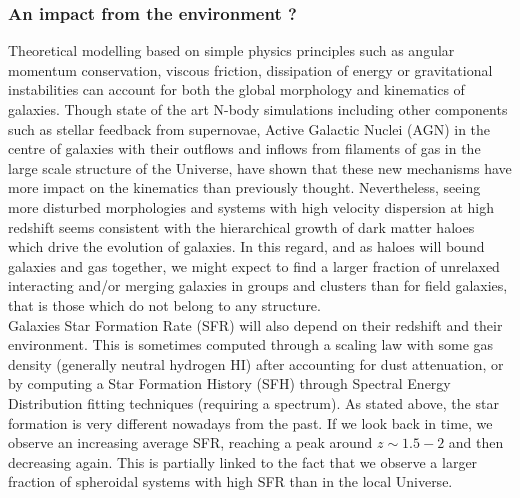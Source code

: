 \subsubsection{An impact from the environment ?}

Theoretical modelling based on simple physics principles such as angular momentum conservation, viscous friction, dissipation of energy or gravitational instabilities can account for both the global morphology and kinematics of galaxies. Though state of the art N-body simulations including other components such as stellar feedback from supernovae, Active Galactic Nuclei (AGN) in the centre of galaxies with their outflows and inflows from filaments of gas in the large scale structure of the Universe, have shown that these new mechanisms have more impact on the kinematics than previously thought. Nevertheless, seeing more disturbed morphologies and systems with high velocity dispersion at high redshift seems consistent with the hierarchical growth of dark matter haloes which drive the evolution of galaxies. In this regard, and as haloes will bound galaxies and gas together, we might expect to find a larger fraction of unrelaxed interacting and/or merging galaxies in groups and clusters than for field galaxies, that is those which do not belong to any structure. \\


Galaxies Star Formation Rate (SFR) will also depend on their redshift and their environment. This is sometimes computed through a scaling law with some gas density (generally neutral hydrogen HI) after accounting for dust attenuation, or by computing a Star Formation History (SFH) through Spectral Energy Distribution fitting techniques (requiring a spectrum). As stated above, the star formation is very different nowadays from the past. If we look back in time, we observe an increasing average SFR, reaching a peak around $z \sim 1.5 - 2$ and then decreasing again. This is partially linked to the fact that we observe a larger fraction of spheroidal systems with high SFR than in the local Universe. 

